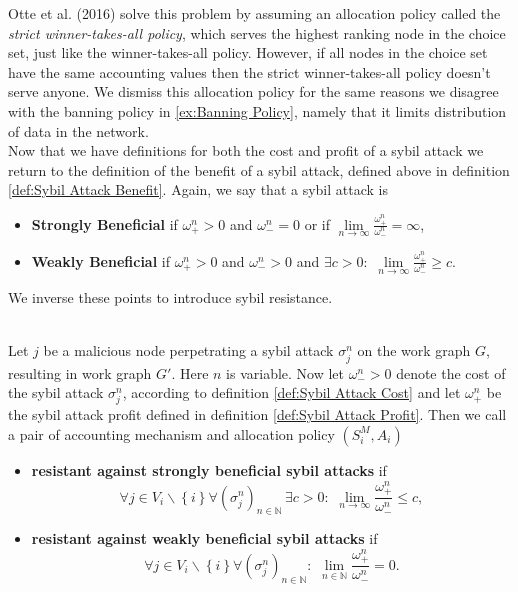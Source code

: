 \noindent{}Otte et al. (2016) solve this problem by assuming an allocation policy called the \textit{strict winner-takes-all policy}, which serves the highest ranking node in the choice set, just like the winner-takes-all policy. However, if all nodes in the choice set have the same accounting values then the strict winner-takes-all policy doesn't serve anyone. We dismiss this allocation policy for the same reasons we disagree with the banning policy in \ref{ex:Banning Policy}, namely that it limits distribution of data in the network.\vspace{1em}\\ 

\noindent{}Now that we have definitions for both the cost and profit of a sybil attack we return to the definition of the benefit of a sybil attack, defined above in definition \ref{def:Sybil Attack Benefit}. Again, we say that a sybil attack is 

\begin{itemize}
\item[] {\bf Strongly Beneficial} if $\omega^n_{+}>0$ and $\omega^n_{-}=0$ or if $\lim\limits_{n\rightarrow\infty}\frac{\omega^n_{+}}{\omega^n_{-}}=\infty$,
\item[] {\bf Weakly Beneficial} if $\omega^n_{+}>0$ and $\omega^n_{-}>0$ and $\exists c>0:\,\,\lim\limits_{n\rightarrow\infty}\frac{\omega^n_{+}}{\omega^n_{-}}\geq{}c$.
\end{itemize}

\noindent{}We inverse these points to introduce sybil resistance.

\begin{definition}\ \\
\label{def:Sybil Resistance}
\noindent{}Let $j$ be a malicious node perpetrating a sybil attack $\sigma_j^n$ on the work graph $G$, resulting in work graph $G'$. Here $n$ is variable. Now let $\omega_{-}^{n}>0$ denote the cost of the sybil attack $\sigma_j^n$, according to definition \ref{def:Sybil Attack Cost} and let $\omega_{+}^n$ be the sybil attack profit defined in definition \ref{def:Sybil Attack Profit}. Then we call a pair of accounting mechanism and allocation policy $(S^M_i,A_i)$
\begin{itemize}
\item {\bf resistant against strongly beneficial sybil attacks} if 
\[
\forall{}j\in{}V_i\backslash{}\left\lbrace{}i\right\rbrace \forall (\sigma^n_j)_{n\in\mathbb{N}}\,\exists{}c>0:\,\,\lim\limits_{n\rightarrow\infty}\frac{\omega^n_{+}}{\omega^n_{-}}\leq{}c,
\]
\item {\bf resistant against weakly beneficial sybil attacks} if 
\[
\forall{}j\in{}V_i\backslash{}\left\lbrace{}i\right\rbrace \forall (\sigma^n_j)_{n\in\mathbb{N}}:\,\,\lim\limits_{n\in\mathbb{N}}\frac{\omega^n_{+}}{\omega^n_{-}}=0.
\]
\end{itemize}
\end{definition}

